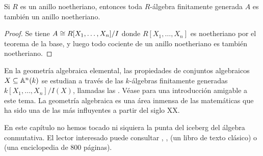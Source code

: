 \begin{observacion}
  Si $R$ es un anillo noetheriano, entonces toda $R$-álgebra finitamente
  generada $A$ es también un anillo noetheriano.

  \begin{proof}
    Se tiene $A \isom R [X_1,\ldots,X_n]/I$ donde $R [X_1,\ldots,X_n]$ es
    noetheriano por el teorema de la base, y luego todo cociente de un anillo
    noetheriano es también noetheriano.
  \end{proof}
\end{observacion}

En la geometría algebraica elemental, las propiedades de conjuntos algebraicos
$X \subseteq \AA^n (k)$ se estudian a través de las $k$-álgebras finitamente
generadas $k [X_1,\ldots,X_n]/I(X)$, llamadas las . Véase
\cite{Fulton-curves} para una introducción amigable a este tema. La geometría
algebraica es una área inmensa de las matemáticas que ha sido una de las más
influyentes a partir del siglo XX.

En este capítulo no hemos tocado ni siquiera la punta del iceberg del álgebra
conmutativa. El lector interesado puede consultar \cite{Sharp-steps},
\cite{Reid-UCA}, \cite{Atiyah-Macdonald} (un libro de texto clásico)
o \cite{Eisenbud} (una enciclopedia de 800 páginas).
